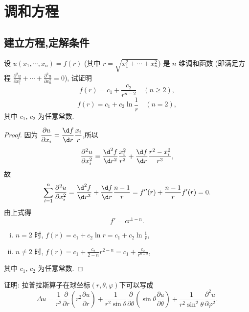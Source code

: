 \chapter{调和方程}

\section{建立方程,定解条件}

\begin{exercise}
  设 $u(x_1,\cdots,x_n)=f(r)$ (其中 $r=\sqrt{x_1^2+\cdots+x_n^2}$)
  是 $n$ 维调和函数 (即满足方程
  $\displaystyle\frac{\partial^2u}{\partial x_1^2}+\cdots+\frac{\partial^2u}{\partial x_n^2}=0$),
  试证明
  \[f(r) = c_1+\frac{c_2}{r^{n-2}}\quad (n\geq 2),\]
  \[f(r) = c_1+c_2\ln\frac{1}{r}\quad (n=2),\]
  其中 $c_1$, $c_2$ 为任意常数.
\end{exercise}

\begin{proof}
  因为 $\displaystyle\frac{\partial u}{\partial x_i}=\frac{\d f}{\d r}\frac{x_i}{r}$,所以
  \[\frac{\partial^2u}{\partial x_i^2} =
    \frac{\d^2f}{\d r^2}\frac{x_i^2}{r^2}
    + \frac{\d f}{\d r}\frac{r^2-x_i^2}{r^3},\]
  故
  \[\sum_{i=1}^n\frac{\partial^2u}{\partial x_i^2}
    = \frac{\d^2f}{\d r^2}+\frac{\d f}{\d r}\frac{n-1}{r}
    = f''(r)+\frac{n-1}{r}f'(r)=0.\]
  由上式得
  \[f'=cr^{1-n}.\]
  \begin{enumerate}[(i)]
    \item $n = 2$ 时, $\displaystyle f(r)=c_1+c_2\ln r=c_1+c_2\ln\frac{1}{r}$,
    \item $n\neq 2$ 时, $\displaystyle f(r)=c_1+\frac{c_2}{2-n}r^{2-n}=c_1+\frac{c_2}{r^{n-2}}$,
  \end{enumerate}
  其中 $c_1$, $c_2$ 为任意常数.
\end{proof}


\begin{exercise}
  证明: 拉普拉斯算子在球坐标$(r,\theta,\varphi)$下可以写成
  \[\Delta u
    = \frac{1}{r^2}\frac{\partial}{\partial r}\left(r^2\frac{\partial u}{\partial r}\right)
    + \frac{1}{r^2\sin\theta}\frac{\partial}{\partial\theta}
      \left(\sin\theta\frac{\partial u}{\partial\theta}\right)
    +\frac{1}{r^2\sin^2\theta}\frac{\partial^2u}{\partial\varphi^2}.\]
\end{exercise}

